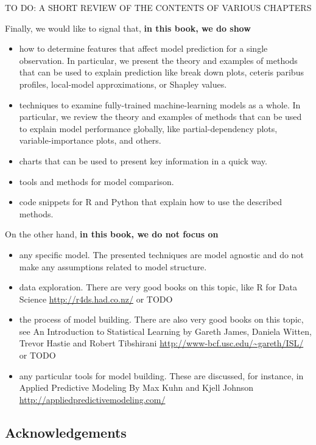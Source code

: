 \documentclass[]{krantz}
\providecommand{\tightlist}{%
  \setlength{\itemsep}{0pt}\setlength{\parskip}{0pt}}
\theoremstyle{definition}
\theoremstyle{definition}
\theoremstyle{definition}
\theoremstyle{remark}
\begin{document}
TO DO: A SHORT REVIEW OF THE CONTENTS OF VARIOUS CHAPTERS

Finally, we would like to signal that, \textbf{in this book, we do show}

\begin{itemize}
\tightlist
\item
  how to determine features that affect model prediction for a single
  observation. In particular, we present the theory and examples of
  methods that can be used to explain prediction like break down plots,
  ceteris paribus profiles, local-model approximations, or Shapley
  values.
\item
  techniques to examine fully-trained machine-learning models as a
  whole. In particular, we review the theory and examples of methods
  that can be used to explain model performance globally, like
  partial-dependency plots, variable-importance plots, and others.
\item
  charts that can be used to present key information in a quick way.
\item
  tools and methods for model comparison.
\item
  code snippets for R and Python that explain how to use the described
  methods.
\end{itemize}

On the other hand, \textbf{in this book, we do not focus on}

\begin{itemize}
\tightlist
\item
  any specific model. The presented techniques are model agnostic and do
  not make any assumptions related to model structure.
\item
  data exploration. There are very good books on this topic, like R for
  Data Science \url{http://r4ds.had.co.nz/} or TODO
\item
  the process of model building. There are also very good books on this
  topic, see An Introduction to Statistical Learning by Gareth James,
  Daniela Witten, Trevor Hastie and Robert Tibshirani
  \url{http://www-bcf.usc.edu/~gareth/ISL/} or TODO
\item
  any particular tools for model building. These are discussed, for
  instance, in Applied Predictive Modeling By Max Kuhn and Kjell Johnson
  \url{http://appliedpredictivemodeling.com/}
\end{itemize}

\hypertarget{thanksto}{%
\subsection{Acknowledgements}\label{thanksto}}
\end{document}
